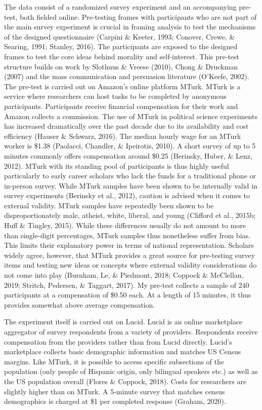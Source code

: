 \documentclass[12pt,econ]{sources/authesis}
\begin{document}
The data consist of a randomized survey experiment and an accompanying pre-test, both fielded online. Pre-testing frames with participants who are not part of the main survey experiment is crucial in framing analysis to test the mechanisms of the designed questionnaire (Carpini \& Keeter, 1993; Conover, Crewe, \& Searing, 1991; Stanley, 2016). The participants are exposed to the designed frames to test the core ideas behind morality and self-interest. This pre-test structure builds on work by Slothuus \& Vreese (2010), Chong \& Druckman (2007) and the mass communication and persuasion literature (O'Keefe, 2002). The pre-test is carried out on Amazon's online platform MTurk. MTurk is a service where researchers can host tasks to be completed by anonymous participants. Participants receive financial compensation for their work and Amazon collects a commission. The use of MTurk in political science experiments has increased dramatically over the past decade due to its availability and cost efficiency (Hauser \& Schwarz, 2016). The median hourly wage for an MTurk worker is \$1.38 (Paolacci, Chandler, \& Ipeirotis, 2010). A short survey of up to 5 minutes commonly offers compensation around \$0.25 (Berinsky, Huber, \& Lenz, 2012). MTurk with its standing pool of participants is thus highly useful particularly to early career scholars who lack the funds for a traditional phone or in-person survey. While MTurk samples have been shown to be internally valid in survey experiments (Berinsky et al., 2012), caution is advised when it comes to external validity. MTurk samples have repeatedly been shown to be disproportionately male, atheist, white, liberal, and young (Clifford et al., 2015b; Huff \& Tingley, 2015). While these differences usually do not amount to more than single-digit percentages, MTurk samples thus nonetheless suffer from bias. This limits their explanatory power in terms of national representation. Scholars widely agree, however, that MTurk provides a great source for pre-testing survey items and testing new ideas or concepts where external validity considerations do not come into play (Burnham, Le, \& Piedmont, 2018; Coppock \& McClellan, 2019; Stritch, Pedersen, \& Taggart, 2017). My pre-test collects a sample of 240 participants at a compensation of \$0.50 each. At a length of 15 minutes, it thus provides somewhat above average compensation.

The experiment itself is carried out on Lucid. Lucid is an online marketplace aggregator of survey respondents from a variety of providers. Respondents receive compensation from the providers rather than from Lucid directly. Lucid's marketplace collects basic demographic information and matches US Census margins. Like MTurk, it is possible to access specific subsections of the population (only people of Hispanic origin, only bilingual speakers etc.) as well as the US population overall (Flores \& Coppock, 2018). Costs for researchers are slightly higher than on MTurk. A 5-minute survey that matches census demographics is charged at \$1 per completed response (Graham, 2020).
\end{document}
